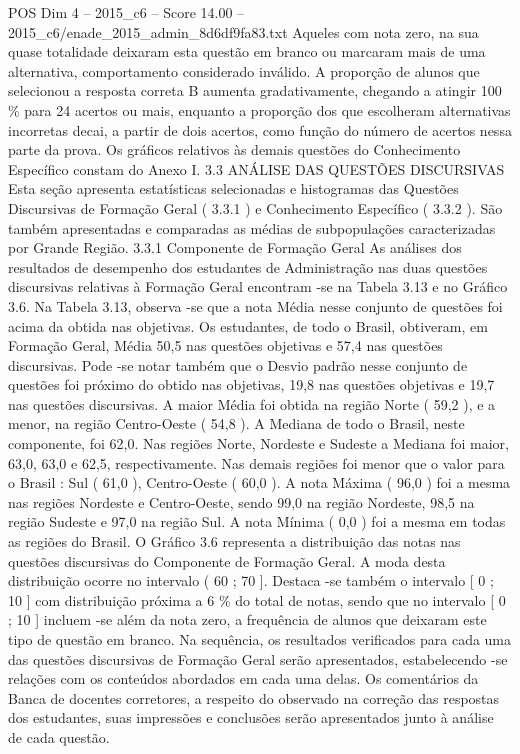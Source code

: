 \begin{textsample}{POS Dim 4 – 2015\_c6 – Score 14.00 – 2015\_c6/enade\_2015\_admin\_8d6df9fa83.txt}
Aqueles com nota zero, na sua quase totalidade deixaram esta questão em branco ou marcaram mais de uma alternativa, comportamento considerado inválido.
A proporção de alunos que selecionou a resposta correta B aumenta gradativamente, chegando a atingir 100 \% para 24 acertos ou mais, enquanto a proporção dos que escolheram alternativas incorretas decai, a partir de dois acertos, como função do número de acertos nessa parte da prova.
Os gráficos relativos às demais questões do Conhecimento Específico constam do Anexo I. 3.3 ANÁLISE DAS QUESTÕES DISCURSIVAS Esta seção apresenta estatísticas selecionadas e histogramas das Questões Discursivas de Formação Geral ( 3.3.1 ) e Conhecimento Específico ( 3.3.2 ).
São também apresentadas e comparadas as médias de subpopulações caracterizadas por Grande Região. 3.3.1 Componente de Formação Geral As análises dos resultados de desempenho dos estudantes de Administração nas duas questões discursivas relativas à Formação Geral encontram -se na Tabela 3.13 e no Gráfico 3.6.
Na Tabela 3.13, observa -se que a nota Média nesse conjunto de questões foi acima da obtida nas objetivas.
Os estudantes, de todo o Brasil, obtiveram, em Formação Geral, Média 50,5 nas questões objetivas e 57,4 nas questões discursivas.
Pode -se notar também que o Desvio padrão nesse conjunto de questões foi próximo do obtido nas objetivas, 19,8 nas questões objetivas e 19,7 nas questões discursivas.
A maior Média foi obtida na região Norte ( 59,2 ), e a menor, na região Centro-Oeste ( 54,8 ).
A Mediana de todo o Brasil, neste componente, foi 62,0.
Nas regiões Norte, Nordeste e Sudeste a Mediana foi maior, 63,0, 63,0 e 62,5, respectivamente.
Nas demais regiões foi menor que o valor para o Brasil : Sul ( 61,0 ), Centro-Oeste ( 60,0 ).
A nota Máxima ( 96,0 ) foi a mesma nas regiões Nordeste e Centro-Oeste, sendo 99,0 na região Nordeste, 98,5 na região Sudeste e 97,0 na região Sul.
A nota Mínima ( 0,0 ) foi a mesma em todas as regiões do Brasil.
O Gráfico 3.6 representa a distribuição das notas nas questões discursivas do Componente de Formação Geral.
A moda desta distribuição ocorre no intervalo ( 60 ; 70 ].
Destaca -se também o intervalo [ 0 ; 10 ] com distribuição próxima a 6 \% do total de notas, sendo que no intervalo [ 0 ; 10 ] incluem -se além da nota zero, a frequência de alunos que deixaram este tipo de questão em branco.
Na sequência, os resultados verificados para cada uma das questões discursivas de Formação Geral serão apresentados, estabelecendo -se relações com os conteúdos abordados em cada uma delas.
Os comentários da Banca de docentes corretores, a respeito do observado na correção das respostas dos estudantes, suas impressões e conclusões serão apresentados junto à análise de cada questão.

\end{textsample}
